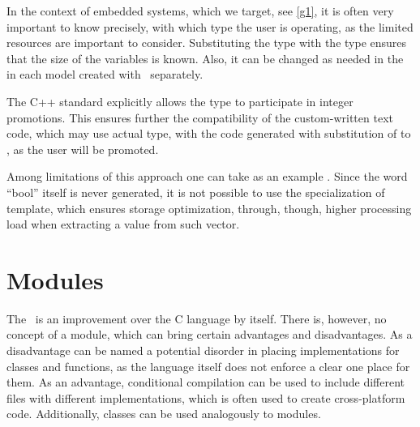 In the context of embedded systems, which we target, see \ref{g1}, it is often very important to 
know precisely, with which type the user is operating, as the limited resources
are important to consider. Substituting the  type with the  type ensures that the size of the  variables is known.
Also, it can be changed as needed in the  in each model created with \mb\ separately.

The C++ standard explicitly allows the  type to participate in integer promotions. This ensures further the compatibility of the custom-written
text code, which may use actual  type, with the code generated with substitution of  to , as the user  will be promoted.

Among limitations of this approach one can take as an example . Since the word ``bool'' itself is never generated, 
it is not possible to use the specialization of template, which ensures storage optimization, through, though, higher processing load when
extracting a value from such vector.

\section{Modules}


% 

The \cpppl\ is an improvement over the C language by itself. There is, however, no concept of a module,
which can bring certain advantages and disadvantages. As a disadvantage can be named a potential disorder
in placing implementations for classes and functions, as the language itself does not enforce a clear
one place for them. As an advantage, conditional compilation can be used to include different files
with different implementations, which is often used to create cross-platform code. Additionally, classes
can be used analogously to modules.

